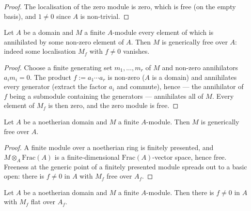 \begin{proof}
  \leanok
The localisation of the zero module is zero, which is free (on the empty
  basis), and \(1 \ne 0\) since \(A\) is non-trivial.
\end{proof}

\begin{lemma}\label{mk-lem:generically_free_torsion}
  \leanok

  Let \(A\) be a domain and \(M\) a finite \(A\)-module every element of which
  is annihilated by some non-zero element of \(A\).  Then \(M\) is generically
  free over \(A\): indeed some localisation \(M_f\) with \(f \ne 0\) vanishes.
\end{lemma}

\begin{proof}
  \leanok
Choose a finite generating set \(m_1, \dots, m_r\) of \(M\) and non-zero
  annihilators \(a_i m_i = 0\).  The product \(f := a_1 \cdots a_r\) is
  non-zero (\(A\) is a domain) and annihilates every generator (extract the
  factor \(a_i\) and commute), hence — the annihilator of \(f\) being a
  submodule containing the generators — annihilates all of \(M\).  Every
  element of \(M_f\) is then zero, and the zero module is free.
\end{proof}

\begin{lemma}\label{mk-lem:generically_free_finite}
  \leanok

  Let \(A\) be a noetherian domain and \(M\) a finite \(A\)-module.  Then \(M\)
  is generically free over \(A\).
\end{lemma}

\begin{proof}
  \leanok
A finite module over a noetherian ring is finitely presented, and
  \(M \otimes_A \mathrm{Frac}(A)\) is a finite-dimensional
  \(\mathrm{Frac}(A)\)-vector space, hence free.  Freeness at the generic
  point of a finitely presented module spreads out to a basic open: there is
  \(f \ne 0\) in \(A\) with \(M_f\) free over \(A_f\).
\end{proof}

\begin{lemma}\label{mk-lem:generically_flat_finite}
  \leanok

  Let \(A\) be a noetherian domain and \(M\) a finite \(A\)-module.  Then there
  is \(f \ne 0\) in \(A\) with \(M_f\) flat over \(A_f\).
\end{lemma}

